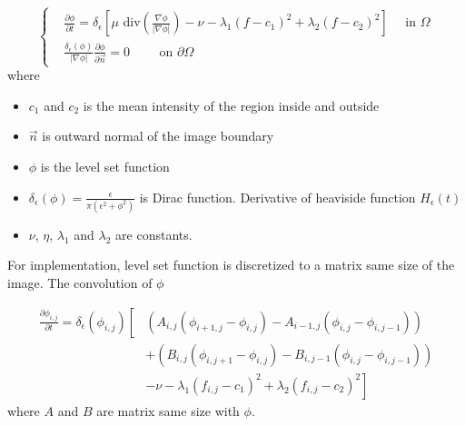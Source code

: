 \begin{equation}
    \left\{ 
        \begin{aligned}
        & \frac{\partial \phi}{\partial t} = 
                \delta_{\epsilon} \left[
                \mu \text{ div} \left( \frac{\nabla \phi}{|\nabla \phi|} \right) - 
                \nu - 
                \lambda_1 (f-c_1)^2 +
                \lambda_2 (f-c_2)^2
                \right] \quad \text{ in } \Omega\\
        & \frac{\delta_{\epsilon}(\phi)}{|\nabla \phi|} 
            \frac{\partial \phi}{\partial \overrightarrow{n}}
            = 0
            \qquad \text{ on } \partial \Omega
        \end{aligned}
    \right.
\end{equation}
where

{\small
\begin{itemize}
    \item $c_1$  and $c_2$ is the mean intensity of the region inside and outside
    \item $\overrightarrow{n}$ is outward normal of the image boundary
    \item $\phi$ is the level set function
    \item $\delta_{\epsilon}(\phi) = \frac{\epsilon}{\pi (\epsilon^2 + \phi^2)}$ is Dirac function. Derivative of heaviside function $H_{\epsilon}(t)$
    \item $\nu$, $\eta$, $\lambda_1$ and $\lambda_2$ are constants.
\end{itemize}
}

For implementation, level set function is discretized to a matrix same size of the image. The convolution of $\phi$

\begin{equation}
    \begin{aligned}
            \frac{\partial \phi_{i, j}}{\partial t} = 
            \delta_{\epsilon}(\phi_{i,j}) \left[ \right.
                    & \left( A_{i,j}(\phi_{i+1, j} - \phi_{i,j})
                            - A_{i-1,j}(\phi_{i, j} - \phi_{i,j-1}) \right) \\
                    & + \left( B_{i, j}(\phi_{i, j+1} - \phi_{i, j}) - 
                             B_{i, j-1}(\phi_{i, j} - \phi_{i, j-1}) \right) \\
                    & - \nu - 
                        \lambda_1(f_{i,j} - c_1)^2 +
                        \lambda_2(f_{i, j} - c_2)^2 
                        \left. \right]
    \end{aligned}
    \label{eq:phi}
\end{equation}
where $A$ and $B$ are matrix same size with $\phi$.

